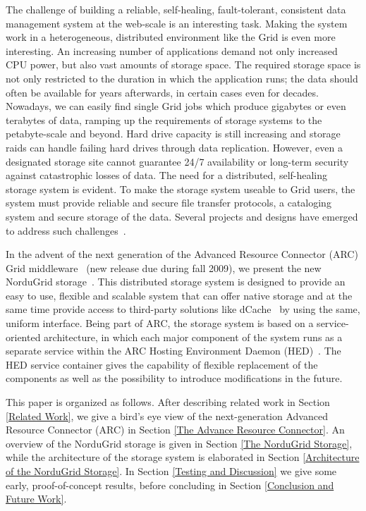 \documentclass[final]{ieee}
\begin{document}
The challenge of building a reliable, self-healing, fault-tolerant,
consistent data management system at the web-scale is an interesting
task. Making the system work in a heterogeneous, distributed
environment like the Grid is even more interesting. An increasing
number of applications demand not only increased CPU power, but also
vast amounts of storage space. The required storage space is not only
restricted to the duration in which the application runs; the data
should often be available for years afterwards, in certain cases even
for decades. Nowadays, we can easily find single Grid jobs which produce
gigabytes or even terabytes of data, ramping up the requirements of
storage systems to the petabyte-scale and beyond. Hard drive capacity is
still increasing and storage raids can handle failing hard drives through 
data replication. However, even a designated storage site cannot guarantee 
24/7 availability or long-term security against catastrophic losses of data. 
The need for a distributed, self-healing storage system is evident. To
make the storage system useable to Grid users, the system must provide
reliable and secure file transfer protocols, a cataloging system and
secure storage of the data. Several projects and designs have emerged
to address such challenges~\cite{Hoschek00datamanagement,DengWang}.

In the advent of the next generation of the Advanced Resource
Connector (ARC) Grid middleware~\cite{arc} (new release due during
fall 2009), we present the new NorduGrid storage~\cite{ARCStoragedesigndoc}. This distributed storage system is
designed to provide an easy to use, flexible and scalable system that
can offer native storage and at the same time provide access to
third-party solutions like dCache~\cite{dCache,DSSWithdCache} by using
the same, uniform interface. Being part of ARC, the storage system is
based on a service-oriented architecture, in which each major
component of the system runs as a separate service within the ARC
Hosting Environment Daemon (HED)~\cite{HEDdesigndoc}. The HED service
container gives the capability of flexible replacement of the
components as well as the possibility to introduce modifications in
the future. %

This paper is organized as follows. After describing
related work in Section \ref{Related Work}, we give a bird's eye
view of the next-generation Advanced Resource Connector (ARC) in
Section \ref{The Advance Resource Connector}. An overview of the NorduGrid storage is given in Section \ref{The NorduGrid Storage}, while
the architecture of the storage system is elaborated in Section
\ref{Architecture of the NorduGrid Storage}. In Section \ref{Testing and
  Discussion} we give some early, proof-of-concept results, before 
concluding in Section \ref{Conclusion and Future Work}. 
\end{document}
